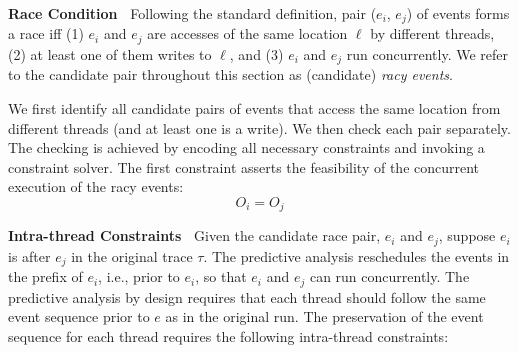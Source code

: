 
{\bf Race Condition\ } Following the standard definition, pair ($e_i$, $e_j$) of events forms a race iff (1) $e_i$ and $e_j$ are accesses of the same location $\ell$ by different threads, (2) at least one of them writes to $\ell$, and (3) $e_i$ and $e_j$ run concurrently. We refer to the candidate pair throughout this section as (candidate) \emph{racy events}.  

We first identify all candidate pairs of events that access the same location from different threads (and at least one is a write). We then check each pair  separately.   The checking is achieved by encoding all necessary constraints and invoking a constraint solver.  The first constraint asserts the feasibility of the concurrent execution of the racy events:
$$
O_{i} = O_{j}
$$



{\bf Intra-thread Constraints\ } Given the candidate race pair, $e_i$ and $e_j$, suppose $e_i$ is after $e_j$ in the original trace $\tau$. The predictive analysis reschedules the events in the prefix of $e_i$, i.e., prior to $e_i$, so that $e_i$ and $e_j$ can run concurrently. The predictive analysis by design requires that each thread should follow the same event sequence prior to $e$ as in the original run.  The preservation of the event sequence for each thread requires the following intra-thread constraints:

